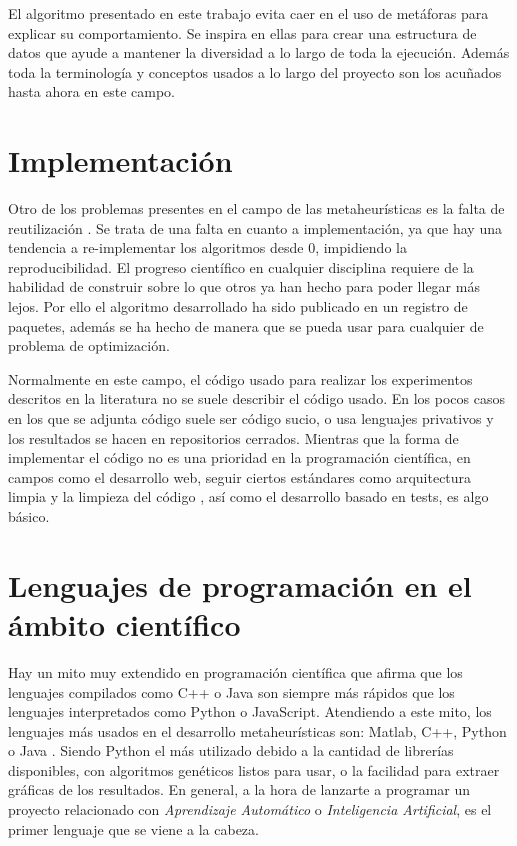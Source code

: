 El algoritmo presentado en este trabajo evita caer en el uso de metáforas para explicar su comportamiento. Se inspira en ellas para crear una estructura de datos que ayude 
a mantener la diversidad a lo largo de toda la ejecución. Además toda la terminología y conceptos usados a lo largo del proyecto son los acuñados hasta ahora en este campo.

\section{Implementación}

Otro de los problemas presentes en el campo de las metaheurísticas es la falta de reutilización \cite{metaheuristics}. Se trata de una falta en cuanto a implementación, ya que hay una
tendencia a re-implementar los algoritmos desde 0, impidiendo la reproducibilidad. El progreso científico en cualquier disciplina requiere de la habilidad de construir sobre lo que
otros ya han hecho para poder llegar más lejos. Por ello el algoritmo desarrollado ha sido publicado en un registro de paquetes, además se ha hecho de manera que se pueda usar para 
cualquier de problema de optimización. 

Normalmente en este campo, el código usado para realizar los experimentos descritos en la literatura no se suele describir el código usado. En los
pocos casos en los que se adjunta código suele ser código sucio, o usa lenguajes privativos y los resultados se hacen en repositorios cerrados. 
Mientras que la forma de implementar el código no es una prioridad en la programación científica, 
en campos como el desarrollo web, seguir ciertos estándares como arquitectura limpia \cite{cleanArquitecture2017} y la 
limpieza del código \cite{cleanCode2008}, así como el desarrollo basado en tests, es algo básico.

\section{Lenguajes de programación en el ámbito científico}

Hay un mito muy extendido en programación científica que afirma que los lenguajes compilados como C++ o Java son siempre más rápidos que los lenguajes interpretados como Python o 
JavaScript. Atendiendo a este mito, los lenguajes más usados en el desarrollo metaheurísticas son: Matlab, C++, Python o Java \cite{languages}. Siendo Python el más 
utilizado debido a la cantidad de librerías disponibles, con algoritmos genéticos listos para usar, o la facilidad para extraer gráficas de los resultados. En general, a 
la hora de lanzarte a programar un proyecto relacionado con \emph{Aprendizaje Automático} o \emph{Inteligencia Artificial}, es el primer lenguaje que se viene a la cabeza. 


